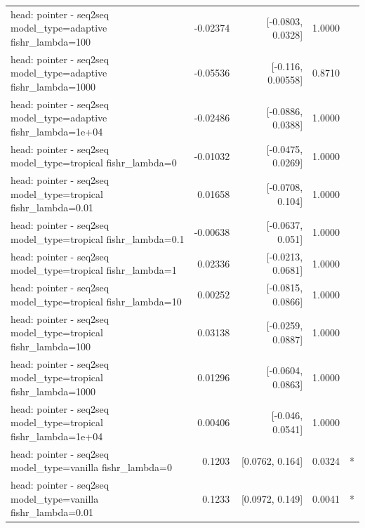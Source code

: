 \documentclass[10pt]{article}
\makeatletter
\newcommand{\stackcell}[1]{\begin{tabular}[t]{@{}l@{}}#1\end{tabular}}
\makeatother
\begin{document}
{\begin{longtable}{lrrrl}
\stackcell{head: pointer - seq2seq\\\footnotesize model\_type=adaptive fishr\_lambda=100 } & -0.02374 & [-0.0803, 0.0328] & 1.0000 & \\
\stackcell{head: pointer - seq2seq\\\footnotesize model\_type=adaptive fishr\_lambda=1000 } & -0.05536 & [-0.116, 0.00558] & 0.8710 & \\
\stackcell{head: pointer - seq2seq\\\footnotesize model\_type=adaptive fishr\_lambda=1e+04 } & -0.02486 & [-0.0886, 0.0388] & 1.0000 & \\
\stackcell{head: pointer - seq2seq\\\footnotesize model\_type=tropical fishr\_lambda=0 } & -0.01032 & [-0.0475, 0.0269] & 1.0000 & \\
\stackcell{head: pointer - seq2seq\\\footnotesize model\_type=tropical fishr\_lambda=0.01 } & 0.01658 & [-0.0708, 0.104] & 1.0000 & \\
\stackcell{head: pointer - seq2seq\\\footnotesize model\_type=tropical fishr\_lambda=0.1 } & -0.00638 & [-0.0637, 0.051] & 1.0000 & \\
\stackcell{head: pointer - seq2seq\\\footnotesize model\_type=tropical fishr\_lambda=1 } & 0.02336 & [-0.0213, 0.0681] & 1.0000 & \\
\stackcell{head: pointer - seq2seq\\\footnotesize model\_type=tropical fishr\_lambda=10 } & 0.00252 & [-0.0815, 0.0866] & 1.0000 & \\
\stackcell{head: pointer - seq2seq\\\footnotesize model\_type=tropical fishr\_lambda=100 } & 0.03138 & [-0.0259, 0.0887] & 1.0000 & \\
\stackcell{head: pointer - seq2seq\\\footnotesize model\_type=tropical fishr\_lambda=1000 } & 0.01296 & [-0.0604, 0.0863] & 1.0000 & \\
\stackcell{head: pointer - seq2seq\\\footnotesize model\_type=tropical fishr\_lambda=1e+04 } & 0.00406 & [-0.046, 0.0541] & 1.0000 & \\
\stackcell{head: pointer - seq2seq\\\footnotesize model\_type=vanilla fishr\_lambda=0 } & 0.1203 & [0.0762, 0.164] & 0.0324 & *\\
\stackcell{head: pointer - seq2seq\\\footnotesize model\_type=vanilla fishr\_lambda=0.01 } & 0.1233 & [0.0972, 0.149] & 0.0041 & *\\

\end{longtable}}
\end{document}
